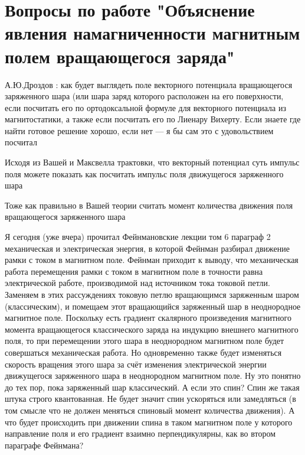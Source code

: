 \documentclass{article}
\begin{document}
\section{Вопросы по работе "Объяснение явления намагниченности магнитным полем вращающегося заряда"}
А.Ю.Дроздов :
как будет выглядеть поле векторного потенциала вращающегося заряженного шара (или шара заряд которого расположен на его поверхности, если посчитать его по ортодоксальной формуле для векторного потенциала из магнитостатики, а также если посчитать его по Лиенару Вихерту. Если знаете где найти готовое решение хорошо, если нет — я бы сам это с удовольствием посчитал

Исходя из Вашей и Максвелла трактовки, что векторный потенциал суть импульс поля можете показать как посчитать импульс поля движущегося заряженного шара

Тоже как правильно в Вашей теории считать момент количества движения поля вращающегося заряженного шара

Я сегодня (уже вчера) прочитал Фейнмановские лекции том 6 параграф 2 механическая и электрическая энергия, в которой Фейнман разбирал движение рамки с током в магнитном поле. Фейнман приходит к выводу, что механическая работа перемещения рамки с током в магнитном поле в точности равна электрической работе, производимой над источником тока токовой петли. Заменяем в этих рассуждениях токовую петлю вращающимся заряженным шаром (классическим), и помещаем этот вращающийся заряженный шар в неоднородное магнитное поле. Поскольку есть градиент скалярного произведения магнитного момента вращающегося классического заряда на индукцию внешнего магнитного поля, то при перемещении этого шара в неоднородном магнитном поле будет совершаться механическая работа. Но одновременно также будет изменяться скорость вращения этого шара за счёт изменения электрической энергии движущегося заряженного шара в неоднородном магнитном поле. Ну это понятно до тех пор, пока заряженный шар классический. А если это спин? Спин же такая штука строго квантованная. Не будет значит спин ускоряться или замедляться (в том смысле что не должен меняться спиновый момент количества движения). А что будет происходить  при движении спина в таком магнитном поле у которого направление поля и его градиент взаимно перпендикулярны, как во втором параграфе Фейнмана?
\end{document}
